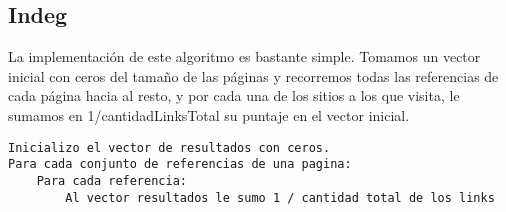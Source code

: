 %	
	

\subsection{Indeg}

La implementación de este algoritmo es bastante simple. Tomamos un vector inicial con ceros del tamaño de las páginas y recorremos todas las referencias de cada página hacia al resto, y por cada una de los sitios a los que visita, le sumamos en 1/cantidadLinksTotal su puntaje en el vector inicial.

\begin{lstlisting}[frame=single] 
Inicializo el vector de resultados con ceros.
Para cada conjunto de referencias de una pagina:
	Para cada referencia:
		Al vector resultados le sumo 1 / cantidad total de los links
	
\end{lstlisting}
